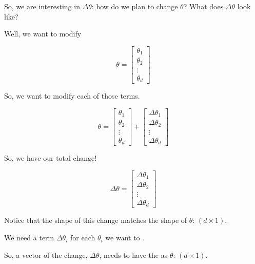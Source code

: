         So, we are interesting in $\Delta \theta$: how do we plan to change $\theta$? What does $\Delta \theta$ look like?
        
        Well, we want to modify
        
        \begin{equation}
            \theta = 
            \begin{bmatrix}
                \theta_1 \\ \theta_2 \\ \vdots \\ \theta_d
            \end{bmatrix}
        \end{equation}
        
        So, we want to modify each of those terms.
        
        \begin{equation}
            \theta 
            = 
            \begin{bmatrix}
                \theta_1 \\ \theta_2 \\ \vdots \\ \theta_d
            \end{bmatrix}
            +
            \begin{bmatrix}
                \Delta \theta_1 \\ \Delta \theta_2 \\ \vdots \\ \Delta \theta_d
            \end{bmatrix}
        \end{equation}
        
        So, we have our total change!
        
        \begin{equation}
            \Delta \theta 
            = 
            \begin{bmatrix}
                \Delta \theta_1 \\ \Delta \theta_2 \\ \vdots \\ \Delta \theta_d
            \end{bmatrix}
        \end{equation}
        
        Notice that the shape of this change matches the shape of $\theta$: $(d \times 1)$.\\
        
        \begin{concept}
            We need a  term $\Delta \theta_i$ for each $\theta_i$ we want to .
            
            So, a vector of the  change, $\Delta \theta$, needs to have the  as $\theta$: $(d \times 1)$.
        \end{concept}
        
